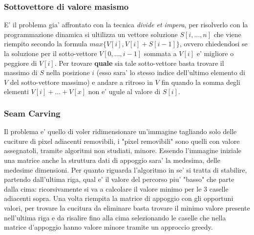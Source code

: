 \documentclass{article}
\begin{document}
\subsubsection{Sottovettore di valore masismo}
E' il problema gia' affrontato con la tecnica \textit{divide et impera}, per risolverlo con la programmazione dinamica 
si ultilizza un vettore soluzione $S[i,...,n]$ che viene riempito secondo la formula $max\{V[i], V[i] + S[i-1]\}$, ovvero chiedendosi
se la soluzione per il sotto-vettore $V[0,...,i-1]$ sommata a $V[i]$ e' migliore o peggiore di $V[i]$. 
Per trovare \textbf{quale} sia tale sotto-vettore basta trovare il massimo di $S$ nella posizione $i$ (esso sara' lo stesso indice dell'ultimo elemento di $V$ del sotto-vettore massimo)
e andare a ritroso in $V$ fin quando la somma degli elementi $V[i]+...+V[x]$ non e' ugule al valore di $S[i]$. 


\subsubsection{Seam Carving}
Il problema e' quello di voler ridimensionare un'immagine tagliando solo delle cuciture di pixel adiacenti removibili,
 i "pixel removibili" sono quelli con valore assegnatoli, tramite algoritmi non studiati, minore. 
Essendo l'immagine iniziale una matrice anche la struttura dati di appoggio sara' la medesima, delle medesime dimensioni.
Per quanto riguarda l'algoritmo in se' si tratta di stabilire, partendo dall'ultima riga, qual e' il valore del percorso piu' "basso" che parte dalla cima: 
ricorsivamente si va a calcolare il valore minimo per le 3 caselle adiacenti sopra. 
Una volta riempita la matrice di appoggio con gli opportuni valori, per trovare la cucitura da eliminare basta trovare il minimo valore presente nell'ultima riga e da risalire fino alla cima selezionando le caselle che nella matrice d'appoggio hanno valore minore tramite un approccio greedy.
\end{document}
